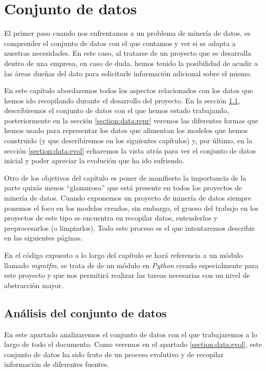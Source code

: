 \chapter{Conjunto de datos}
\label{chapter:dataset}
El primer paso cuando nos enfrentamos a un problema de minería de datos, es comprender el conjunto de datos con el que contamos y ver si se adapta a nuestras necesidades. En este caso, al tratarse de un proyecto que se desarrolla dentro de una empresa, en caso de duda, hemos tenido la posibilidad de acudir a las áreas dueñas del dato para solicitarle información adicional sobre el mismo. 


En este capítulo abordaremos todos los aspectos relacionados con los datos que hemos ido recopilando durante el desarrollo del proyecto. En la sección \ref{section:data:ana}, describiremos el conjunto de datos con el que hemos estado trabajando, posteriormente en la sección \ref{section:data:repr} veremos las diferentes formas que hemos usado para representar los datos que alimentan los modelos que hemos construido (y que describiremos en los siguientes capítulos) y, por último, en la sección \ref{section:data:evol} echaremos la vista atrás para ver el conjunto de datos inicial y poder apreciar la evolución que ha ido sufriendo.


Otro de los objetivos del capítulo es poner de manifiesto la importancia de la parte quizás menos ``glamurosa'' que está presente en todos los proyectos de minería de datos. Cuando exponemos un proyecto de minería de datos siempre ponemos el foco en los modelos creados, sin embargo, el grueso del trabajo en los proyectos de este tipo se encuentra en recopilar datos, entenderlos y preprocesarlos (o limpiarlos). Todo este proceso es el que intentaremos describir en las siguientes páginas.


En el código expuesto a lo largo del capítulo se hará referencia a un módulo llamado \textit{mgmtfm}, se trata de de un módulo en \textit{Python} creado especialmente para este proyecto y que nos permitirá realizar las tareas necesarias con un nivel de abstracción mayor. 

\section{Análisis del conjunto de datos}
\label{section:data:ana}
En este apartado analizaremos el conjunto de datos con el que trabajaremos a lo largo de todo el documento. Como veremos en el apartado \ref{section:data:evol}, este conjunto de datos ha sido fruto de un proceso evolutivo y de recopilar información de diferentes fuentes. 

